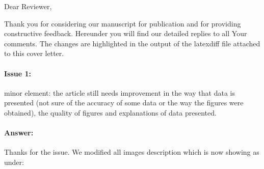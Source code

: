 \documentclass{article}
\begin{document}
Dear Reviewer,

\vspace{0.25in}

Thank you for considering our manuscript for publication and for providing constructive feedback.
Hereunder you will find our detailed replies to all Your comments.
The changes are highlighted in the output of the latexdiff file attached to this cover letter.

\paragraph{Issue 1:}
\begin{displayquote}
minor element: the article still needs improvement in the way that data is presented (not sure of the accuracy of some data or the way the figures were obtained), the quality of figures and explanations of data presented.
\end{displayquote}

\paragraph{Answer:}
Thanks for the issue. We modified all images description which is now showing as under: \\\\
\end{document}
